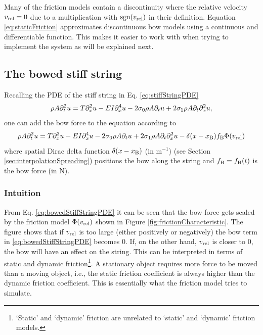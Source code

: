 Many of the friction models contain a discontinuity where the relative velocity $v_\text{rel} = 0$ due to a multiplication with $\text{sgn}(v_\text{rel})$ in their definition. Equation \eqref{eq:staticFriction} approximates discontinuous bow models using a continuous and differentiable function. This makes it easier to work with when trying to implement the system as will be explained next.

\subsection{The bowed stiff string}
Recalling the PDE of the stiff string in Eq. \eqref{eq:stiffStringPDE}
\begin{equation}
    \rho A \partial_t^2 u = T \partial_x^2 u - EI \partial_x^4 u - 2 \sigma_{0} \rho A \partial_t u + 2 \sigma_{1} \rho A\partial_t \partial_x^2 u,
\end{equation}
one can add the bow force to the equation according to 
\begin{equation}\label{eq:bowedStiffStringPDE}
    \rho A \partial_t^2 u = T \partial_x^2 u - EI \partial_x^4 u - 2 \sigma_{0} \rho A \partial_t u + 2 \sigma_{1} \rho A\partial_t \partial_x^2 u - \delta(x-x_{\text{B}})f_{\text{B}}\Phi(v_\text{rel})
\end{equation}
where spatial Dirac delta function $\delta(x-x_{\text{B}})$ (in m$^{-1}$) (see Section \ref{sec:interpolationSpreading}) positions the bow along the string and $f_{\text{B}} = f_{\text{B}}(t)$ is the bow force (in N). 

\subsubsection{Intuition}
From Eq. \eqref{eq:bowedStiffStringPDE} it can be seen that the bow force gets scaled by the friction model $\Phi(v_\text{rel})$ shown in Figure \ref{fig:frictionCharacteristic}. 
The figure shows that if $v_\text{rel}$ is too large (either positively or negatively) the bow term in \eqref{eq:bowedStiffStringPDE} becomes $0$. If, on the other hand, $v_\text{rel}$ is closer to $0$, the bow will have an effect on the string. This can be interpreted in terms of static and dynamic friction\footnote{`Static' and `dynamic' friction are unrelated to `static' and `dynamic' friction models.}. A stationary object requires more force to be moved than a moving object, i.e., the static friction coefficient is always higher than the dynamic friction coefficient. This is essentially what the friction model tries to simulate.

